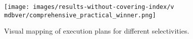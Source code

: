 




\begin{figure}[thb]
  \centering
  \texttt{[image: images/results-without-covering-index/v\\mdbver/comprehensive\_practical\_winner.png]}
  \vspace*{-0.5\baselineskip}
  \caption{Visual mapping of execution plans for different selectivities.}
  \label{fig:grid-sample}
  \Description{\relname}
\end{figure}


